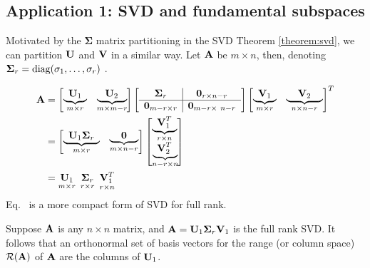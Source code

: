 \documentclass[a4paper]{article}
\numberwithin{equation}{section} %
\newcommand{\myunderbrace}[2]{\mathrlap{\underbrace{\phantom{#1}}_{#2}}
      #1}
\newcommand{\hquad}{\hskip0.5em\relax}%
\newcommand{\B}[1]{\textbf{\textup{#1}}} %
\renewcommand{\eqref}{Eq.~\originaleqref}
\renewcommand*{\eqref}[1]{Eq.~\originaleqref{#1}}
\begin{document}
\subsection{Application 1: SVD and fundamental subspaces}
Motivated by the $\boldsymbol{\Sigma}$ matrix partitioning in the SVD Theorem \ref{theorem:svd}, we can partition $\B{U}$ and $\B{V}$ in a similar way. Let $\B{A}$ be $m \times n$, then, denoting $\boldsymbol{\Sigma}_r = \textup{diag}(\sigma_1,\ldots , \sigma_r)$ \cite{lec_notes_hyde}.

\begin{align}
\B{A} &= \begin{bmatrix}\myunderbrace{\hquad \B{U}_1  \hquad}{m \times r} & \myunderbrace{\hquad \ \B{U}_2 \hquad \ }{m \times m-r} \end{bmatrix}
\begin{bmatrix}
\begin{array}{c|c}
\boldsymbol{\Sigma}_r & \B{0}_{r\times n-r} \\
\hline
\B{0}_{m-r\times r} & \B{0}_{m-r\times\ n-r}
\end{array}
\end{bmatrix}
\begin{bmatrix}\myunderbrace{\hquad \B{V}_1  \hquad}{m \times r} & \myunderbrace{\hquad \ \ \B{V}_2 \hquad \ \ }{n \times n-r} \end{bmatrix}^T \nonumber \\
& = \begin{bmatrix}\myunderbrace{\hquad \B{U}_1\boldsymbol{\Sigma}_r  \hquad}{m \times r} & \myunderbrace{\hquad \ \ \B{0} \hquad \ \ }{m \times n-r}  \end{bmatrix} 
\begin{bmatrix}\myunderbrace{\hquad \B{V}_1^T \hquad}{r \times n} \\
\myunderbrace{\hquad \B{V}_2^T \hquad}{n-r \times n } 
\end{bmatrix} \nonumber \\
&= \underset{m\times r}{\mathop{{{\mathbf{U}}_{1}}}}\, \ \underset{r\times r}{\mathop{{{\mathbf{\Sigma }}_{r}}}}\, \ \underset{r\times n}{\mathop{{{\mathbf{V}}_{1}^T}}}\ 
\label{eq:svd_compact}
\end{align}
\eqref{eq:svd_compact} is a more compact form of SVD for full rank.
\begin{corollary}
Suppose $\B{A}$ is any $n \times n$ matrix, and $\B{A}=\B{U}_1\boldsymbol{\Sigma}_r\B{V}_1$ is the full rank SVD.  It follows that an orthonormal set of basis vectors for the range (or column space) $\mathcal{R}(\B{A})$ of $\B{A}$ are the columns of $\B{U}_1$\cite{lec_notes_hyde}.
\end{corollary}
\end{document}
